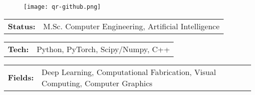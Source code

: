 \documentclass[10pt,A4]{article}
\newcommand{\tzlarrow}{(0,0) -- (0.2,0) -- (0.3,0.2) -- (0.2,0.4) -- (0,0.4) -- (0.1,0.2) -- cycle;}
\newcommand{\larrow}[1]
{\begin{tikzpicture}[scale=0.58]
	 \filldraw[fill=#1!100,draw=#1!100!black]  \tzlarrow
 \end{tikzpicture}
}
\newcommand{\metasection}[2]
{
\begin{tabular*}{1\textwidth}{p{2.0cm} p{10cm}}
\larrow{sectcol}	\normalsize{\textbf{#1}}&#2\\[12pt]
\end{tabular*}
}
\begin{document}
\pagestyle{fancy}	


\vspace{-20.55pt}


\hspace{-0.25\linewidth}\colorbox{bgcol}{}



\begin{figure}[H]
\begin{flushright}
	\texttt{[image: qr-github.png]}
\end{flushright}
\end{figure}



\vspace{-114pt}

\metasection{Status:}{M.Sc. Computer Engineering, Artificial Intelligence}
\metasection{Tech:}{Python, PyTorch, Scipy/Numpy, C++}
\metasection{Fields:}{Deep Learning, Computational Fabrication, Visual Computing, Computer Graphics}
\vspace{12pt}  %
\end{document}
